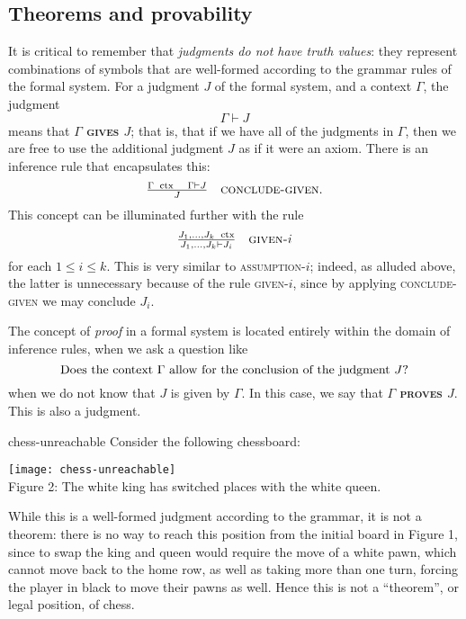 \documentclass{article}
\newcommand{\defn}[1]{{\scshape\bfseries\color{MPBemph}#1}}
\newcommand{\infrule}[3]{\genfrac{}{}{}{}{#1}{#2}\hspace{1em}{\textsc{#3}}}
\DeclareMathOperator{\ctx}{~ctx}
\newcommand{\gives}{\vdash}
\newcommand{\1}{\textbf{1}}
\newcommand{\0}{\mathbf{0}}
\newcommand{\2}{\textbf{2}}
\begin{document}
\subsection{Theorems and provability}
It is critical to remember that \emph{judgments do not have truth values}: they represent combinations of symbols that are well-formed according to the grammar rules of the formal system. For a judgment \( J \) of the formal system, and a context \( \Gamma \), the judgment
\[ \Gamma \gives J \]
means that \defn{\( \Gamma \) gives \( J \)}; that is, that if we have all of the judgments in \( \Gamma \), then we are free to use the additional judgment \( J \) as if it were an axiom. There is an inference rule that encapsulates this:
\[ \OD \infrule{\Gamma \ctx \hspace{1em} \Gamma \gives J}{J}{conclude-given}. \]
This concept can be illuminated further with the rule
\[ \OD \infrule{J_{1},\dotsc, J_{k} \ctx}{J_{1},\dotsc, J_{k} \gives J_{i}}{given-\( i \)} \]
for each \( 1 \leq i \leq k \). This is very similar to \textsc{assumption-\( i \)}; indeed, as alluded above, the latter is unnecessary because of the rule \textsc{given-\( i \)}, since by applying \textsc{conclude-given} we may conclude \( J_{i} \).

The concept of \emph{proof} in a formal system is located entirely within the domain of inference rules, when we ask a question like
\[ \text{Does the context \( \Gamma \) allow for the conclusion of the judgment \( J \)?} \]
when we do not know that \( J \) is given by \( \Gamma \). In this case, we say that \defn{\( \Gamma \) proves \( J \)}. This is also a judgment.
\begin{example}{}{chess-unreachable}
	Consider the following chessboard:\vspace{6pt}
	\begin{center}
		\texttt{[image: chess-unreachable]} \\[3pt]
		Figure 2: The white king has switched places with the white queen.
	\end{center}
	While this is a well-formed judgment according to the grammar, it is not a theorem: there is no way to reach this position from the initial board in Figure 1, since to swap the king and queen would require the move of a white pawn, which cannot move back to the home row, as well as taking more than one turn, forcing the player in black to move their pawns as well. Hence this is not a ``theorem'', or legal position, of chess.
\end{example}
\end{document}

